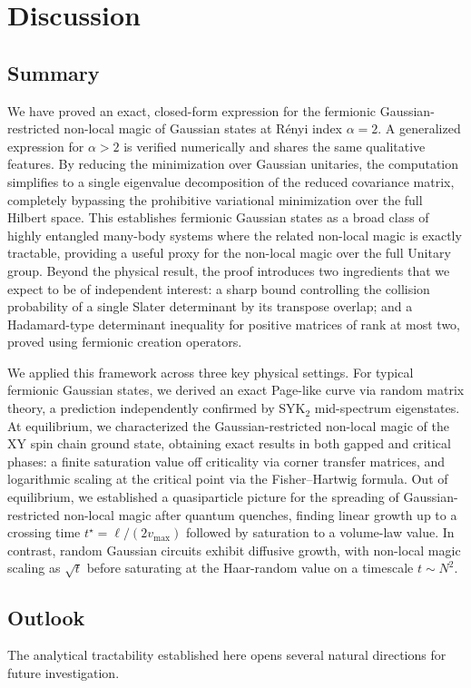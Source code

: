 \documentclass[prx,twocolumn,superscriptaddress,aps,10pt, frontmatterverbose, reprint,footinbib,longbibliography=true]{revtex4-2}
\newcommand{\RENYI}{\alpha}
\begin{document}
\section{Discussion}

\subsection{Summary}
We have proved an exact, closed-form expression for the fermionic Gaussian-restricted non-local magic of Gaussian states at R\'enyi index $\RENYI=2$. A generalized expression for $\RENYI>2$ is verified numerically and shares the same qualitative features.
By reducing the minimization over Gaussian unitaries, the computation simplifies to a single eigenvalue decomposition of the reduced covariance matrix, completely bypassing the prohibitive variational minimization over the full Hilbert space. This establishes fermionic Gaussian states as a broad class of highly entangled many-body systems where the related non-local magic is exactly tractable, providing a useful proxy for the non-local magic over the full Unitary group.
Beyond the physical result, the proof introduces two ingredients that we expect to be of independent interest: a sharp bound controlling the collision probability of a single Slater determinant by its transpose overlap; and a Hadamard-type determinant inequality for positive matrices of rank at most two, proved using fermionic creation operators.


We applied this framework across three key physical settings.
For typical fermionic Gaussian states, we derived an exact Page-like curve via random matrix theory, a prediction independently confirmed by SYK$_2$ mid-spectrum eigenstates.
At equilibrium, we characterized the Gaussian-restricted non-local magic of the XY spin chain ground state, obtaining exact results in both gapped and critical phases: a finite saturation value off criticality via corner transfer matrices, and logarithmic scaling at the critical point via the Fisher--Hartwig formula.
Out of equilibrium, we established a quasiparticle picture for the spreading of Gaussian-restricted non-local magic after quantum quenches, finding linear growth up to a crossing time $t^\star= \ell/(2v_\mathrm{max})$  followed by saturation to a volume-law value.
In contrast, random Gaussian circuits exhibit diffusive growth, with non-local magic scaling as $\sqrt{t}$ before saturating at the Haar-random value on a timescale $t\sim N^2$.


\subsection{Outlook}
The analytical tractability established here opens several natural directions for future investigation.
\end{document}
